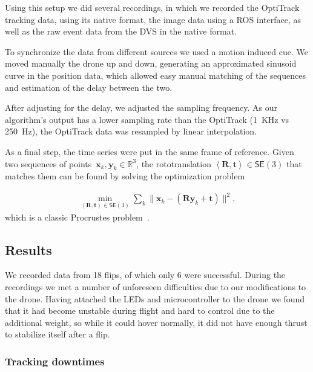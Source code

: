 Using this setup we did several recordings, in which we recorded the
OptiTrack tracking data, using its native format, the image data using
a ROS interface, as well as the raw event data from the DVS in the
native format. 

To synchronize the data from different sources we used a motion induced
cue. We moved manually the drone up and down, generating an approximated
sinusoid curve in the position data, which allowed easy manual matching
of the sequences and estimation of the delay between the two.

After adjusting for the delay, we adjusted the sampling frequency.
As our algorithm's output has a lower sampling rate than the OptiTrack
(1~KHz vs 250~Hz), the OptiTrack data was resampled by linear interpolation.



As a final step, the time series were put in the same frame of reference.
Given two sequences of points~$\boldsymbol{x}_{k},\boldsymbol{y}_{k}\in\mathbb{R}^{3}$,
the rototranslation $\left\langle \boldsymbol{R},\boldsymbol{t}\right\rangle \in\mathsf{SE}(3)$
that matches them can be found by solving the optimization problem

\begin{equation}
\begin{aligned}\min_{\left\langle \boldsymbol{R},\boldsymbol{t}\right\rangle \in\mathsf{SE}(3)}\sum_{k}\|\boldsymbol{x}_{k}-(\boldsymbol{R}\boldsymbol{y}_{k}+\boldsymbol{t})\|^{2},\end{aligned}
\label{eq:leastsquares}
\end{equation}
which is a classic Procrustes problem~\cite{gower04procrustes}.




\subsection{Results \label{sec:evaluation}}

We recorded data from 18 flips, of which only 6 were successful. During
the recordings we met a number of unforeseen difficulties due to our
modifications to the drone. Having attached the LEDs and microcontroller
to the drone we found that it had become unstable during flight and
hard to control due to the additional weight, so while it could hover
normally, it did not have enough thrust to stabilize itself after
a flip.




\subsubsection{Tracking downtimes\label{sec:trackingspeed}}

